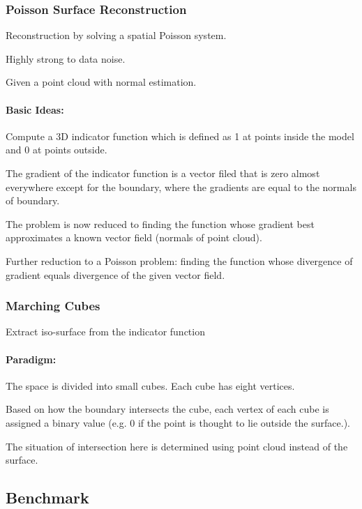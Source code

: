 \subsubsection*{Poisson Surface Reconstruction}


\begin{DoxyItemize}
\item Reconstruction by solving a spatial Poisson system.
\item Highly strong to data noise.
\item Given a point cloud with normal estimation.
\end{DoxyItemize}

\paragraph*{Basic Ideas\+:}


\begin{DoxyItemize}
\item Compute a 3D indicator function which is defined as 1 at points inside the model and 0 at points outside.
\item The gradient of the indicator function is a vector filed that is zero almost everywhere except for the boundary, where the gradients are equal to the normals of boundary.
\item The problem is now reduced to finding the function whose gradient best approximates a known vector field (normals of point cloud).
\item Further reduction to a Poisson problem\+: finding the function whose divergence of gradient equals divergence of the given vector field. 


\end{DoxyItemize}

\subsubsection*{Marching Cubes}


\begin{DoxyItemize}
\item Extract iso-\/surface from the indicator function
\end{DoxyItemize}

\paragraph*{Paradigm\+:}


\begin{DoxyEnumerate}
\item The space is divided into small cubes. Each cube has eight vertices.
\item Based on how the boundary intersects the cube, each vertex of each cube is assigned a binary value (e.\+g. 0 if the point is thought to lie outside the surface.).
\item The situation of intersection here is determined using point cloud instead of the surface. 


\end{DoxyEnumerate}

\subsection*{Benchmark}





 